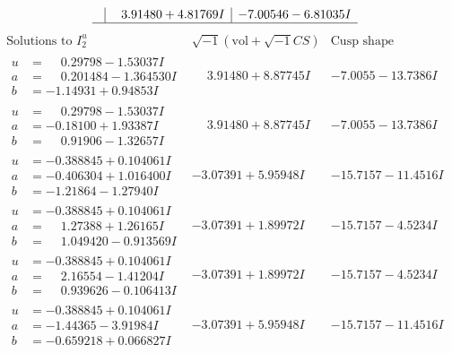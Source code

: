 \documentclass[1p]{elsarticle_modified}
\theoremstyle{definition}
\newcommand{\I}{\sqrt{-1}}
\begin{document}
$$\begin{array}{c|c|c}
 & \phantom{-}3.91480 + 4.81769 I & -7.00546 - 6.81035 I\\
 \hline 
 \end{array}$$\newpage$$\begin{array}{c|c|c}  
\text{Solutions to }I^u_{2}& \I (\text{vol} + \sqrt{-1}CS) & \text{Cusp shape}\\
 \hline 
\begin{aligned}
u &= \phantom{-}0.29798 - 1.53037 I \\
a &= \phantom{-}0.201484 - 1.364530 I \\
b &= -1.14931 + 0.94853 I\end{aligned}
 & \phantom{-}3.91480 + 8.87745 I & -7.0055 - 13.7386 I \\ \hline\begin{aligned}
u &= \phantom{-}0.29798 - 1.53037 I \\
a &= -0.18100 + 1.93387 I \\
b &= \phantom{-}0.91906 - 1.32657 I\end{aligned}
 & \phantom{-}3.91480 + 8.87745 I & -7.0055 - 13.7386 I \\ \hline\begin{aligned}
u &= -0.388845 + 0.104061 I \\
a &= -0.406304 + 1.016400 I \\
b &= -1.21864 - 1.27940 I\end{aligned}
 & -3.07391 + 5.95948 I & -15.7157 - 11.4516 I \\ \hline\begin{aligned}
u &= -0.388845 + 0.104061 I \\
a &= \phantom{-}1.27388 + 1.26165 I \\
b &= \phantom{-}1.049420 - 0.913569 I\end{aligned}
 & -3.07391 + 1.89972 I & -15.7157 - 4.5234 I \\ \hline\begin{aligned}
u &= -0.388845 + 0.104061 I \\
a &= \phantom{-}2.16554 - 1.41204 I \\
b &= \phantom{-}0.939626 - 0.106413 I\end{aligned}
 & -3.07391 + 1.89972 I & -15.7157 - 4.5234 I \\ \hline\begin{aligned}
u &= -0.388845 + 0.104061 I \\
a &= -1.44365 - 3.91984 I \\
b &= -0.659218 + 0.066827 I\end{aligned}
 & -3.07391 + 5.95948 I & -15.7157 - 11.4516 I \\ \hline\begin{aligned}

\end{aligned}
\end{array}$$
\end{document}
